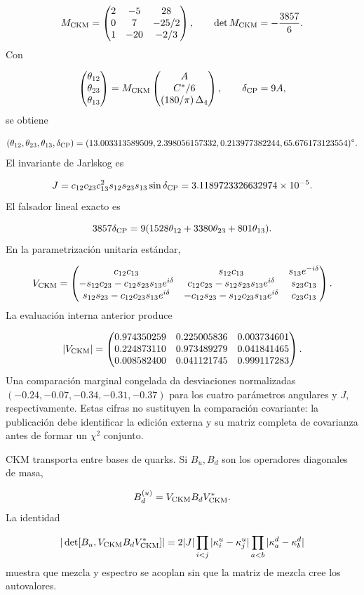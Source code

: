 \[
M_{\rm CKM}=
\begin{pmatrix}
2&-5&28\\
0&7&-25/2\\
1&-20&-2/3
\end{pmatrix},
\qquad
\det M_{\rm CKM}=-\frac{3857}{6}.
\]
Con

\[
\begin{pmatrix}\theta_{12}\\\theta_{23}\\\theta_{13}\end{pmatrix}
=M_{\rm CKM}
\begin{pmatrix}A\\C^*/6\\{\left(180/\pi\right)\Delta_4}\end{pmatrix},
\qquad
\delta_{\rm CP}=9A,
\]
se obtiene

\[
(\theta_{12},\theta_{23},\theta_{13},\delta_{\rm CP})
=
(13.003313589509,
2.398056157332,
0.213977382244,
65.676173123554)^\circ.
\]
El invariante de Jarlskog es

\[
J=c_{12}c_{23}c_{13}^2s_{12}s_{23}s_{13}\sin\delta_{\rm CP}
=3.1189723326632974\times10^{-5}.
\]
El falsador lineal exacto es

\[
3857\delta_{\rm CP}
=9(1528\theta_{12}+3380\theta_{23}+801\theta_{13}).
\]
En la parametrización unitaria estándar,

\[
V_{\rm CKM}=
\begin{pmatrix}
c_{12}c_{13}&s_{12}c_{13}&s_{13}e^{-i\delta}\cr
-s_{12}c_{23}-c_{12}s_{23}s_{13}e^{i\delta}&
c_{12}c_{23}-s_{12}s_{23}s_{13}e^{i\delta}&s_{23}c_{13}\cr
s_{12}s_{23}-c_{12}c_{23}s_{13}e^{i\delta}&
-c_{12}s_{23}-s_{12}c_{23}s_{13}e^{i\delta}&c_{23}c_{13}
\end{pmatrix}.
\]
La evaluación interna anterior produce

\[
|V_{\rm CKM}|=
\begin{pmatrix}
0.974350259&0.225005836&0.003734601\cr
0.224873110&0.973489279&0.041841465\cr
0.008582400&0.041121745&0.999117283
\end{pmatrix}.
\]
Una comparación marginal congelada da desviaciones normalizadas \((-0.24,-0.07,-0.34,-0.31,-0.37)\) para los cuatro parámetros angulares y \(J\), respectivamente. Estas cifras no sustituyen la comparación covariante: la publicación debe identificar la edición externa y su matriz completa de covarianza antes de formar un \(\chi^2\) conjunto.

CKM transporta entre bases de quarks. Si \(B_u,B_d\) son los operadores diagonales de masa,

\[
B_d^{(u)}=V_{\rm CKM}B_dV_{\rm CKM}^*.
\]
La identidad

\[
|\det[B_u,V_{\rm CKM}B_dV_{\rm CKM}^*]|
=2|J|
\prod_{i<j}|\kappa_i^u-\kappa_j^u|
\prod_{a<b}|\kappa_a^d-\kappa_b^d|
\]
muestra que mezcla y espectro se acoplan sin que la matriz de mezcla cree los autovalores.

